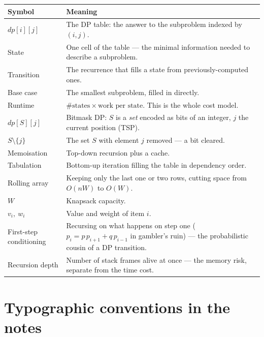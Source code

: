 \documentclass[10pt,letterpaper,onecolumn]{article}
\makeatletter
\newenvironment{symtab}
  {\begin{longtable}{@{}>{\raggedright\arraybackslash}p{0.26\textwidth}%
                       >{\raggedright\arraybackslash}p{0.70\textwidth}@{}}
   \toprule
   \textbf{Symbol} & \textbf{Meaning} \\
   \midrule
   \endhead
   \bottomrule
   \endfoot}
  {\end{longtable}}
\makeatother
\begin{document}
\begin{symtab}
$dp[i][j]$ & The DP table: the answer to the subproblem indexed by $(i,j)$. \\
State & One cell of the table — the minimal information needed to describe a subproblem. \\
Transition & The recurrence that fills a state from previously-computed ones. \\
Base case & The smallest subproblem, filled in directly. \\
Runtime & $\#\text{states} \times \text{work per state}$. This is the whole cost model. \\
$dp[S][j]$ & Bitmask DP: $S$ is a \emph{set} encoded as bits of an integer, $j$ the current position (TSP). \\
$S \setminus \{j\}$ & The set $S$ with element $j$ removed — a bit cleared. \\
Memoisation & Top-down recursion plus a cache. \\
Tabulation & Bottom-up iteration filling the table in dependency order. \\
Rolling array & Keeping only the last one or two rows, cutting space from $O(nW)$ to $O(W)$. \\
$W$ & Knapsack capacity. \\
$v_i,\ w_i$ & Value and weight of item $i$. \\
First-step conditioning & Recursing on what happens on step one ($p_i = p\,p_{i+1} + q\,p_{i-1}$ in gambler's ruin) — the probabilistic cousin of a DP transition. \\
Recursion depth & Number of stack frames alive at once — the memory risk, separate from the time cost. \\
\end{symtab}

\section{Typographic conventions in the notes}
\end{document}
